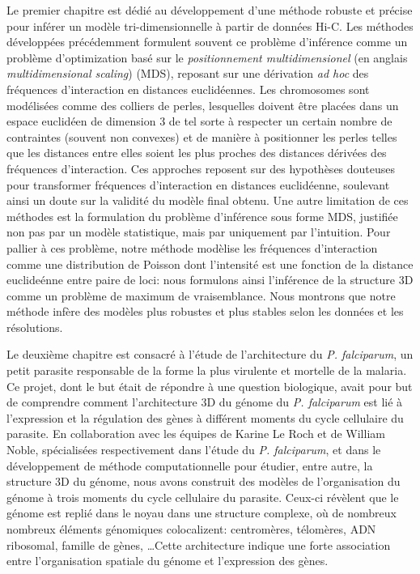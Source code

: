 \begin{resumes}
Le premier chapitre est dédié au développement d'une méthode robuste et
précise pour inférer un modèle tri-dimensionnelle à partir de données Hi-C.
Les méthodes développées précédemment formulent souvent ce problème
d'inférence comme un problème d'optimization basé sur le {\em positionnement
multidimensionel} (en anglais {\em multidimensional scaling}) (MDS),
reposant sur une
dérivation {\em ad hoc} des fréquences d'interaction en distances
euclidéennes. Les chromosomes sont modélisées comme des colliers de perles,
lesquelles doivent être placées dans un espace euclidéen de dimension 3 de tel
sorte à respecter un certain nombre de contraintes (souvent non convexes) et
de manière à positionner les perles telles que les distances entre elles
soient les plus proches des distances dérivées des fréquences d'interaction.
Ces approches reposent sur des hypothèses douteuses pour transformer
fréquences d'interaction en distances euclidéenne, soulevant ainsi un doute
sur la validité du modèle final obtenu.
Une autre limitation de ces méthodes est la
formulation du problème d'inférence sous forme MDS, justifiée non pas par un
modèle statistique, mais par uniquement par l'intuition.
Pour pallier à ces problème, notre méthode modèlise les fréquences
d'interaction comme une
distribution de Poisson dont l'intensité est une fonction de la distance
euclideénne entre paire de loci: nous formulons ainsi l'inférence de la
structure 3D comme un problème de maximum de vraisemblance. Nous montrons que
notre méthode infère des modèles plus robustes et plus stables selon les
données et les résolutions.

Le deuxième chapitre est consacré à l'étude de l'architecture du {\em P.
falciparum}, un petit parasite responsable de la forme la plus virulente et
mortelle de la malaria. Ce projet, dont le but était de répondre à une
question biologique, avait pour but de comprendre comment l'architecture 3D du
génome du {\em P. falciparum} est lié à l'expression et la régulation des
gènes à différent moments du cycle cellulaire du parasite. En collaboration
avec les équipes de Karine Le Roch et de William Noble, spécialisées
respectivement dans l'étude du {\em P. falciparum}, et dans le développement
de méthode computationnelle pour étudier, entre autre, la structure 3D du
génome, nous avons construit des modèles de l'organisation du génome à trois
moments du cycle cellulaire du parasite. Ceux-ci révèlent que le génome est
replié dans le noyau dans une structure complexe, où de nombreux 
nombreux éléments génomiques colocalizent: centromères, télomères, ADN
ribosomal, famille
de gènes, \dots Cette architecture indique une forte association entre
l'organisation spatiale du génome et l'expression des gènes.


\end{resumes}
